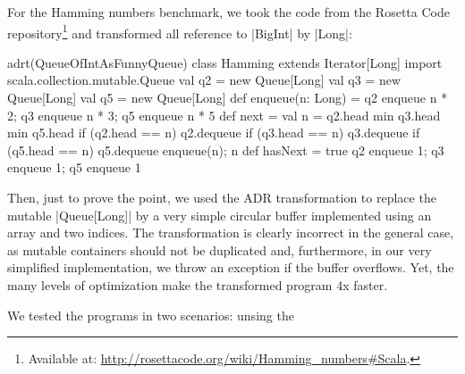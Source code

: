 For the Hamming numbers benchmark, we took the code from the Rosetta Code repository\footnote{Available at: \url{http://rosettacode.org/wiki/Hamming_numbers#Scala}.} and transformed all reference to |BigInt| by |Long|:

\begin{lstlisting-nobreak}
adrt(QueueOfIntAsFunnyQueue) {
  class Hamming extends Iterator[Long] {
    import scala.collection.mutable.Queue
    val q2 = new Queue[Long]
    val q3 = new Queue[Long]
    val q5 = new Queue[Long]
    def enqueue(n: Long) =
      q2 enqueue n * 2; q3 enqueue n * 3; q5 enqueue n * 5
    def next = {
      val n = q2.head min q3.head min q5.head
      if (q2.head == n) q2.dequeue
      if (q3.head == n) q3.dequeue
      if (q5.head == n) q5.dequeue
      enqueue(n); n
    }
    def hasNext = true
    q2 enqueue 1; q3 enqueue 1; q5 enqueue 1
  }
}
\end{lstlisting-nobreak}

Then, just to prove the point, we used the ADR transformation to replace the mutable |Queue[Long]| by a very simple circular buffer implemented using an array and two indices. The transformation is clearly incorrect in the general case, as mutable containers should not be duplicated and, furthermore, in our very simplified implementation, we throw an exception if the buffer overflows. Yet, the many levels of optimization make the transformed program 4x faster.

We tested the programs in two scenarios: unsing the


